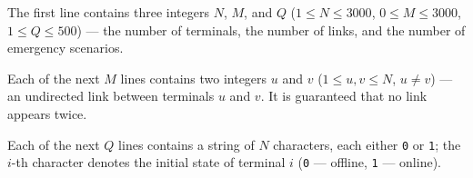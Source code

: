 The first line contains three integers $N$, $M$, and $Q$ ($1 \le N \le 3000$, $0 \le M \le 3000$, $1 \le Q \le 500$) --- the number of terminals, the number of links, and the number of emergency scenarios.

Each of the next $M$ lines contains two integers $u$ and $v$ ($1 \le u, v \le N$, $u \neq v$) --- an undirected link between terminals $u$ and $v$. It is guaranteed that no link appears twice.

Each of the next $Q$ lines contains a string of $N$ characters, each either \texttt{0} or \texttt{1}; the $i$-th character denotes the initial state of terminal $i$ (\texttt{0} --- offline, \texttt{1} --- online).
